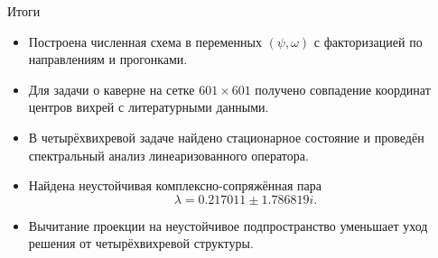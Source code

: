 \documentclass[aspectratio=169,10pt]{beamer}
\begin{document}
\begin{frame}{Итоги}
    \begin{itemize}
        \item Построена численная схема в переменных \((\psi,\omega)\) с факторизацией по направлениям и прогонками.
        \item Для задачи о каверне на сетке \(601\times601\) получено совпадение координат центров вихрей с литературными данными.
        \item В четырёхвихревой задаче найдено стационарное состояние и проведён спектральный анализ линеаризованного оператора.
        \item Найдена неустойчивая комплексно-сопряжённая пара
        \[
            \lambda=0.217011\pm1.786819i.
        \]
        \item Вычитание проекции на неустойчивое подпространство уменьшает уход решения от четырёхвихревой структуры.
    \end{itemize}
\end{frame}
\end{document}
